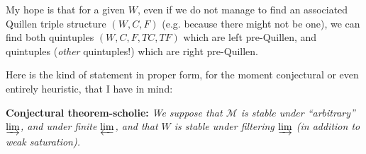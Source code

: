 \documentclass[11pt]{article}
\newcommand{\cM}{\mathcal{M}}
\begin{document}
My hope is that for a given $W$, even if we do not manage to find an associated Quillen triple structure $(W,C,F)$ (e.g. because there might not be one), we can find both quintuples $(W,C,F,TC,TF)$ which are left pre-Quillen, and quintuples (\textit{other} quintuples!) which are right pre-Quillen.

Here is the kind of statement in proper form, for the moment conjectural or even entirely heuristic, that I have in mind:

\textbf{Conjectural theorem-scholie:} \textit{We suppose that $\cM$ is stable under ``arbitrary'' $\varinjlim$, and under finite $\varprojlim$, and that $W$ is stable under filtering $\varinjlim$ (in addition to weak saturation).}
\end{document}
